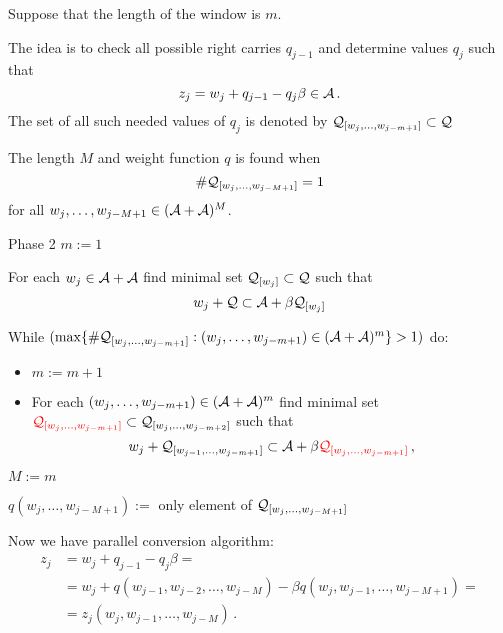     
    Suppose that the length of the window is $m$.
    
    The idea is to check all possible right carries $q_{j-1}$ and determine values $q_j$ such that 
    $$
    z_j=w_j + q_{j-1} - q_j \beta \in \mathcal{A} \,.
    $$
    The set of all such needed values of $q_j$ is denoted by $\mathcal{Q}_{[w_{j},\dots, w_{j-m+1}]}\subset \mathcal{Q}$
        
    
    The length $M$ and weight function $q$ is found when 
    $$
    \#\mathcal{Q}_{[w_{j},\dots, w_{j-M+1}]}=1
    $$
    for all $w_{j},\dots, w_{j-M+1} \in (\mathcal{A}+\mathcal{A})^M$.
    



    {Phase 2}
      $m:=1$
      
      For each $w_j \in \mathcal{A}+\mathcal{A}$ find minimal set $\mathcal{Q}_{[w_j]} \subset \mathcal{Q}$ such that
      $$
      w_j + \mathcal{Q} \subset \mathcal{A} + \beta \mathcal{Q}_{[w_j]}
      $$
    
      While $(\max\{\#\mathcal{Q}_{[w_j,\dots, w_{j-m+1}]}:(w_j,\dots, w_{j-m+1}) \in (\mathcal{A}+\mathcal{A})^m \} > 1)$ do:
      \begin{itemize}
          
          \item $m:= m +1$
          
          \item For each $(w_j,\dots, w_{j-m+1}) \in (\mathcal{A}+\mathcal{A})^{m}$ find minimal set $\textcolor{red}{\mathcal{Q}_{[w_j,\dots, w_{j-m+1}]}} \subset \mathcal{Q}_{[w_j,\dots, w_{j-m+2}]}$ such that
          $$
          w_j + \mathcal{Q}_{[w_{j-1},\dots, w_{j-m+1}]} \subset \mathcal{A} + \beta \textcolor{red}{\mathcal{Q}_{[w_j,\dots, w_{j-m+1}]}}\,,
          $$
      \end{itemize}
      
      $M:= m$ 
      
      
      $q(w_j,\dots, w_{j-M+1}):=$ only element of $\mathcal{Q}_{[w_j,\dots, w_{j-M+1}]}$
    



        Now we have parallel conversion algorithm:
    \begin{align*}
    z_j&=w_j + q_{j-1} - q_j \beta = \\
       &=w_j + q(w_{j-1},w_{j-2},\dots, w_{j-M}) - \beta q(w_j,w_{j-1},\dots, w_{j-M+1}) = \\
       &= z_j(w_{j},w_{j-1},\dots, w_{j-M})\,.
    \end{align*}




